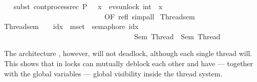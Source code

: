 \begin{isabellebody}
%
\isadelimproof
\ \ %
\endisadelimproof
%
\isatagproof
{}\isamarkupfalse%
{\isacharparenleft}{\kern0pt}subst\ cont{\isacharunderscore}{\kern0pt}process{\isacharunderscore}{\kern0pt}rec{\isacharbrackleft}{\kern0pt}\ P\ {\isacharequal}{\kern0pt}\ {\isacartoucheopen}{\isacharparenleft}{\kern0pt}{\isasymmu}\ x{\isachardot}{\kern0pt}\ {\isacharparenleft}{\kern0pt}{\isasymlambda}{\isasymsigma}{\isachardot}{\kern0pt}\ evs{\isachardot}{\kern0pt}unlock\ {\isacharparenleft}{\kern0pt}{}{\isacharcolon}{\kern0pt}{\isacharcolon}{\kern0pt}int{\isacharparenright}{\kern0pt}\ {\isasymrightarrow}\ x\ {\isasymsigma}{\isacharparenright}{\kern0pt}{\isacharparenright}{\kern0pt}{\isacartoucheclose}{\isacharcomma}{\kern0pt}\ \isanewline
\ \ \ \ \ \ \ \ \ \ \ \ \ \ \ \ \ \ \ \ \ \ \ \ \ \ \ \ OF\ refl{\isacharbrackright}{\kern0pt}{\isacharparenright}{\kern0pt}\ simp{\isacharunderscore}{\kern0pt}all%
\endisatagproof
{\isafoldproof}%
%
\isadelimproof
\isanewline
%
\endisadelimproof
\isanewline
\isanewline
{}\isamarkupfalse%
\ Thread{}{\isacharunderscore}{\kern0pt}sem\ \ \isanewline
{\isachardoublequoteopen}Thread{}{\isacharunderscore}{\kern0pt}sem\ {\isasymequiv}\ {\isacharparenleft}{\kern0pt}\ \isactrlbold {\isacharbar}{\kern0pt}\isactrlbold {\isacharbar}{\kern0pt}\isactrlbold {\isacharbar}{\kern0pt}\ idx\ {\isasymin}{\isacharhash}{\kern0pt}\ mset\ {\isacharbrackleft}{\kern0pt}{}{\isachardot}{\kern0pt}{\isachardot}{\kern0pt}{}{\isacharbrackright}{\kern0pt}{\isachardot}{\kern0pt}\ semaphore\ idx\ {\isacharparenright}{\kern0pt}\ \ \isanewline
\ \ \ \ \ \ \ \ \ \ \ \ \ \ \ \ \ \isanewline
\ \ \ \ \ \ \ \ \ \ \ \ \ \ \ \ \ {\isacharbar}{\kern0pt}{\isacharbar}{\kern0pt}\isanewline
\ \isanewline
\ \ \ \ \ \ \ \ \ \ \ \ \ \ \ \ \ {\isacharparenleft}{\kern0pt}Sem\ Thread{}\ {\isacharbar}{\kern0pt}{\isacharbar}{\kern0pt}{\isacharbar}{\kern0pt}\ Sem\ Thread{}{\isacharparenright}{\kern0pt}{\isachardoublequoteclose}%
\begin{isamarkuptext}%
The architecture , however, will not deadlock, although each single thread will.
This shows that in  locks can mutually deblock each other and have ---
together with the global variables --- global  visibility inside the thread system.%
\end{isamarkuptext}\isamarkuptrue%
%
\begin{isamarkuptext}%

\end{isamarkuptext}
\end{isabellebody}
